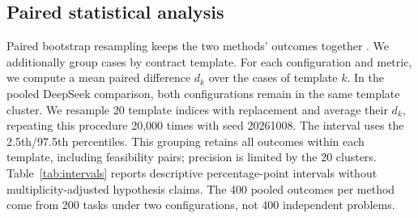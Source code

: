 \subsection{Paired statistical analysis}
Paired bootstrap resampling keeps the two methods' outcomes together \citep{stats}. We additionally group cases by contract template. For each configuration and metric, we compute a mean paired difference $d_k$ over the cases of template $k$. In the pooled DeepSeek comparison, both configurations remain in the same template cluster. We resample 20 template indices with replacement and average their $d_k$, repeating this procedure 20,000 times with seed 20261008. The interval uses the 2.5th/97.5th percentiles. This grouping retains all outcomes within each template, including feasibility pairs; precision is limited by the 20 clusters. Table~\ref{tab:intervals} reports descriptive percentage-point intervals without multiplicity-adjusted hypothesis claims. The 400 pooled outcomes per method come from 200 tasks under two configurations, not 400 independent problems.

\begin{table}[!htbp]
\centering\small

\caption{Paired template-bootstrap differences, \ours\ minus the listed control, on the pooled DeepSeek primary results. Larger exactness and smaller unsafe rate are desirable. Intervals are descriptive, without multiplicity-adjusted hypothesis claims.}
\label{tab:intervals}
\end{table}
